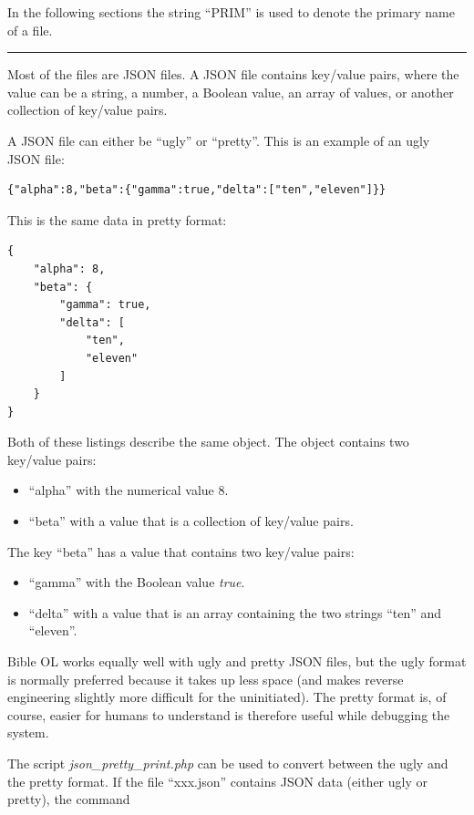 \documentclass[11pt,oneside,a4paper]{memoir}
\begin{document}
In the following sections the string ``PRIM'' is used to denote the primary name of a file.

\pfbreak

Most of the files are JSON files. A JSON file contains key/value pairs, where the value can be
a string, a number, a Boolean value, an array of values, or another collection of key/value pairs.

A JSON file can either be ``ugly'' or ``pretty''. This is an example of an ugly JSON file:

\begin{lstlisting}
{"alpha":8,"beta":{"gamma":true,"delta":["ten","eleven"]}}
\end{lstlisting}

This is the same data in pretty format:

\begin{lstlisting}
{
    "alpha": 8,
    "beta": {
        "gamma": true,
        "delta": [
            "ten",
            "eleven"
        ]
    }
}
\end{lstlisting}

Both of these listings describe the same object. The object contains two key/value pairs:

\begin{itemize}
\item ``alpha'' with the numerical value 8.
\item ``beta'' with a value that is a collection of key/value pairs.
\end{itemize}

The key ``beta'' has a value that contains two key/value pairs:

\begin{itemize}
\item ``gamma'' with the Boolean value \emph{true}.
\item ``delta'' with a value that is an array containing the two strings ``ten'' and ``eleven''.
\end{itemize}


Bible OL works equally well with ugly and pretty JSON files, but the ugly format is normally
preferred because it takes up less space (and makes reverse engineering slightly more difficult for
the uninitiated). The pretty format is, of course, easier for humans to understand is therefore useful
while debugging the system.

The script \emph{json\_pretty\_print.php} can be used to convert between the ugly and the pretty
format. If the file ``xxx.json'' contains JSON data (either ugly or pretty), the command
\end{document}
